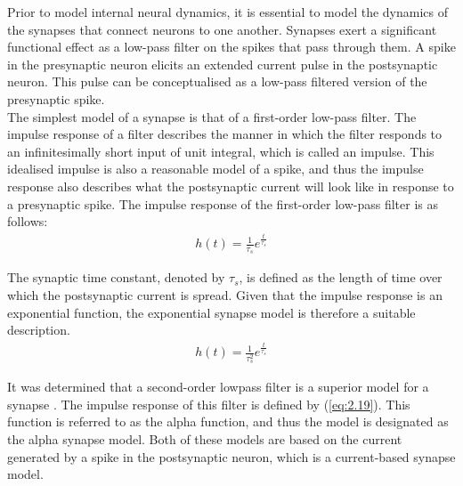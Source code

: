 Prior to model internal neural dynamics, it is essential to model the dynamics of the synapses that connect neurons to one another. Synapses exert a significant functional effect as a low-pass filter on the spikes that pass through them. A spike in the presynaptic neuron elicits an extended current pulse in the postsynaptic neuron. This pulse can be conceptualised as a low-pass filtered version of the presynaptic spike. \\

\noindent The simplest model of a synapse is that of a first-order low-pass filter. The impulse response of a filter describes the manner in which the filter responds to an infinitesimally short input of unit integral, which is called an impulse. This idealised impulse is also a reasonable model of a spike, and thus the impulse response also describes what the postsynaptic current will look like in response to a presynaptic spike. The impulse response of the first-order low-pass filter is as follows:
\begin{align}
h(t) = \frac{1}{\tau_s}e^{\frac{t}{\tau_s}} \label{eq:2.18} 
\end{align}

\noindent The synaptic time constant, denoted by $\tau_s$, is defined as the length of time over which the postsynaptic current is spread. Given that the impulse response is an exponential function, the exponential synapse model is therefore a suitable description.
\begin{align}
h(t) = \frac{1}{\tau_s^2}e^{\frac{t}{\tau_s}} \label{eq:2.19} 
\end{align}

\noindent It was determined that a second-order lowpass filter is a superior model for a synapse \cite{mainen1995reliability}. The impulse response of this filter is defined by (\ref{eq:2.19}). This function is referred to as the alpha function, and thus the model is designated as the alpha synapse model. Both of these models are based on the current generated by a spike in the postsynaptic neuron, which is a current-based synapse model.\\


